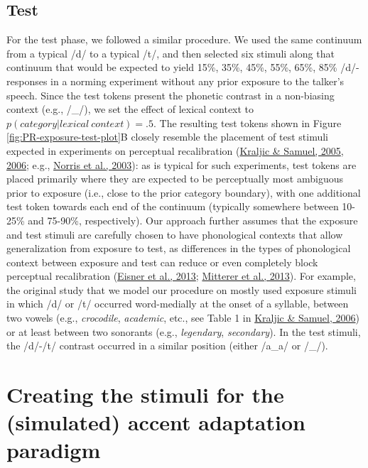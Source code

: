 \documentclass[
  11pt,
  english,
  man,floatsintext]{apa6}
\begin{document}
\hypertarget{test}{%
\subsection{Test}\label{test}}

For the test phase, we followed a similar procedure. We used the same continuum from a typical /d/ to a typical /t/, and then selected six stimuli along that continuum that would be expected to yield 15\%, 35\%, 45\%, 55\%, 65\%, 85\% /d/-responses in a norming experiment without any prior exposure to the talker's speech. Since the test tokens present the phonetic contrast in a non-biasing context (e.g., /\_/), we set the effect of lexical context to \(p(category | lexical\ context) = .5\). The resulting test tokens shown in Figure \ref{fig:PR-exposure-test-plot}B closely resemble the placement of test stimuli expected in experiments on perceptual recalibration (\protect\hyperlink{ref-kraljic-samuel2005}{Kraljic \& Samuel, 2005}, \protect\hyperlink{ref-kraljic-samuel2006}{2006}; e.g., \protect\hyperlink{ref-norris2003}{Norris et al., 2003}): as is typical for such experiments, test tokens are placed primarily where they are expected to be perceptually most ambiguous prior to exposure (i.e., close to the prior category boundary), with one additional test token towards each end of the continuum (typically somewhere between 10-25\% and 75-90\%, respectively). Our approach further assumes that the exposure and test stimuli are carefully chosen to have phonological contexts that allow generalization from exposure to test, as differences in the types of phonological context between exposure and test can reduce or even completely block perceptual recalibration (\protect\hyperlink{ref-eisner2013}{Eisner et al., 2013}; \protect\hyperlink{ref-mitterer2013}{Mitterer et al., 2013}). For example, the original study that we model our procedure on mostly used exposure stimuli in which /d/ or /t/ occurred word-medially at the onset of a syllable, between two vowels (e.g., \emph{crocodile}, \emph{academic}, etc., see Table 1 in \protect\hyperlink{ref-kraljic-samuel2006}{Kraljic \& Samuel, 2006}) or at least between two sonorants (e.g., \emph{legendary}, \emph{secondary}). In the test stimuli, the /d/-/t/ contrast occurred in a similar position (either /a\_a/ or /\_/).

\hypertarget{sec:SI-AA}{%
\section{Creating the stimuli for the (simulated) accent adaptation paradigm}\label{sec:SI-AA}}
\end{document}
